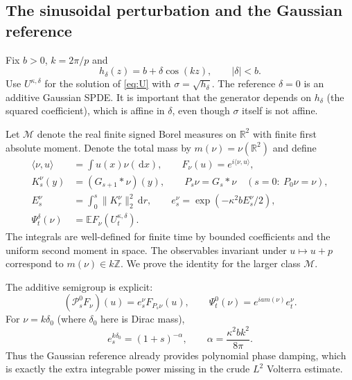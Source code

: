 \documentclass[11pt]{article}
\numberwithin{equation}{section}
\theoremstyle{definition}
\theoremstyle{remark}
\newcommand{\R}{\mathbb R}
\newcommand{\E}{\mathbb E}
\newcommand{\dd}{\,\mathrm d}
\begin{document}
\subsection{The sinusoidal perturbation and the Gaussian reference}
Fix $b>0$, $k=2\pi/p$ and
\begin{equation}\label{eq:cosmodel}
 h_\delta(z)=b+\delta\cos(kz),\qquad |\delta|<b.
\end{equation}
Use $U^{\kappa,\delta}$ for the solution of \eqref{eq:U} with $\sigma=\sqrt{h_\delta}$. The reference $\delta=0$ is an additive Gaussian SPDE. It is important that the generator depends on $h_\delta$ (the squared coefficient), which is affine in $\delta$, even though $\sigma$ itself is not affine.

Let $\mathcal M$ denote the real finite signed Borel measures on $\R^2$ with finite first absolute moment. Denote the total mass by $m(\nu)=\nu(\R^2)$ and define
\begin{align*}
 \langle\nu,u\rangle&=\int u(x)\nu(\dd x),\qquad F_\nu(u)=e^{i\langle\nu,u\rangle},\\
 K_s^\nu(y)&=(G_{s+1}*\nu)(y),\qquad
 P_s\nu=G_s*\nu\quad (s=0:\ P_0\nu=\nu),\\
 E_s^\nu&=\int_0^s\|K_r^\nu\|_2^2\dd r,\qquad
 e_s^\nu=\exp(-\kappa^2 b E_s^\nu/2),\\
 \Psi_t^\delta(\nu)&=\E F_\nu(U_t^{\kappa,\delta}).
\end{align*}
The integrals are well-defined for finite time by bounded coefficients and the uniform second moment in space. The observables invariant under $u\mapsto u+p$ correspond to $m(\nu)\in k\mathbb Z$. We prove the identity for the larger class $\mathcal M$.

The additive semigroup is explicit:
\begin{equation}\label{eq:additive_semigroup}
 (\mathcal P_s^0 F_\nu)(u)=e_s^\nu F_{P_s\nu}(u),\qquad
 \Psi_t^0(\nu)=e^{ia m(\nu)}e_t^\nu.
\end{equation}
For $\nu=k\delta_0$ (where $\delta_0$ here is Dirac mass),
\begin{equation}\label{eq:alpha}
 e_s^{k\delta_0}=(1+s)^{-\alpha},\qquad \alpha=\frac{\kappa^2 b k^2}{8\pi}.
\end{equation}
Thus the Gaussian reference already provides polynomial phase damping, which is exactly the extra integrable power missing in the crude $L^2$ Volterra estimate.
\end{document}
